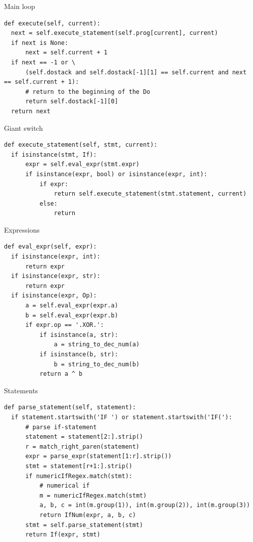 \documentclass{beamer}
\def\py{
  \lstset{
     language=Python,
     extendedchars=true,
     basicstyle=\footnotesize\ttfamily,
     showstringspaces=false,
     showspaces=false,
     numbersep=9pt,
     tabsize=2,
     breaklines=true,
     showtabs=false,
     captionpos=b
  }
}
\begin{document}
\begin{frame}[fragile]{Main loop}
\py
\begin{lstlisting}
def execute(self, current):
  next = self.execute_statement(self.prog[current], current)
  if next is None:
      next = self.current + 1
  if next == -1 or \
      (self.dostack and self.dostack[-1][1] == self.current and next == self.current + 1):
      # return to the beginning of the Do
      return self.dostack[-1][0]
  return next
\end{lstlisting}
\end{frame}

\begin{frame}[fragile]{Giant switch}
\py
\begin{lstlisting}
def execute_statement(self, stmt, current):
  if isinstance(stmt, If):
      expr = self.eval_expr(stmt.expr)
      if isinstance(expr, bool) or isinstance(expr, int):
          if expr:
              return self.execute_statement(stmt.statement, current)
          else:
              return
\end{lstlisting}
\end{frame}

\begin{frame}[fragile]{Expressions}
\py
\begin{lstlisting}
def eval_expr(self, expr):
  if isinstance(expr, int):
      return expr
  if isinstance(expr, str):
      return expr
  if isinstance(expr, Op):
      a = self.eval_expr(expr.a)
      b = self.eval_expr(expr.b)
      if expr.op == '.XOR.':
          if isinstance(a, str):
              a = string_to_dec_num(a)
          if isinstance(b, str):
              b = string_to_dec_num(b)
          return a ^ b
\end{lstlisting}
\end{frame}

\begin{frame}[fragile]{Statements}
\py
\begin{lstlisting}
def parse_statement(self, statement):
  if statement.startswith('IF ') or statement.startswith('IF('):
      # parse if-statement
      statement = statement[2:].strip()
      r = match_right_paren(statement)
      expr = parse_expr(statement[1:r].strip())
      stmt = statement[r+1:].strip()
      if numericIfRegex.match(stmt):
          # numerical if
          m = numericIfRegex.match(stmt)
          a, b, c = int(m.group(1)), int(m.group(2)), int(m.group(3))
          return IfNum(expr, a, b, c)
      stmt = self.parse_statement(stmt)
      return If(expr, stmt)
\end{lstlisting}
\end{frame}
\end{document}
